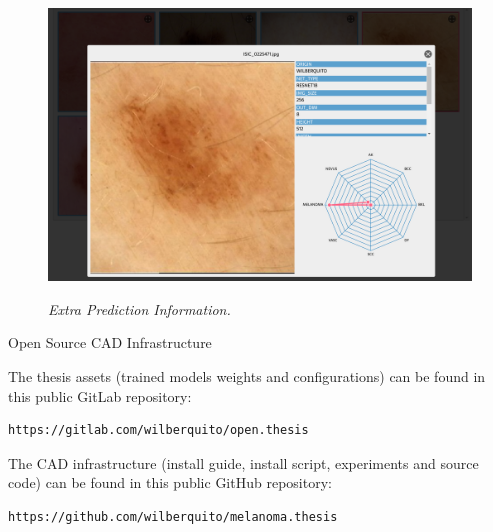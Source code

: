 \documentclass[dvipsnames,mathserif]{beamer}
\begin{document}
{\begin{frame}
      \begin{figure}[H]
        \centering
        \begin{adjustbox}{width=0.7\textwidth, trim={0.05cm 0cm 0.25cm 0cm}, clip}
          \includegraphics[]{images/extra-inf-popup.png}
        \end{adjustbox}
        \caption[Extra Prediction Information]{\textit{Extra Prediction Information.}}
        {\label{fig:extra-inf-popup}}
      \end{figure}

    \end{frame}


    \begin{frame}[fragile]


      \large Open Source CAD Infrastructure
      \vspace{0.25cm}

      \footnotesize

      The thesis assets (trained models weights and configurations) can be found in
      this public GitLab repository:

      \vspace{0.1cm}

      \begin{Verbatim}[fontsize=\tiny]
https://gitlab.com/wilberquito/open.thesis
      \end{Verbatim}

      The CAD infrastructure (install guide, install script, experiments and source code) can be found in
      this public GitHub repository:

      \vspace{0.1cm}

      \begin{Verbatim}[fontsize=\tiny]
https://github.com/wilberquito/melanoma.thesis
      \end{Verbatim}


\end{frame}}
\end{document}

